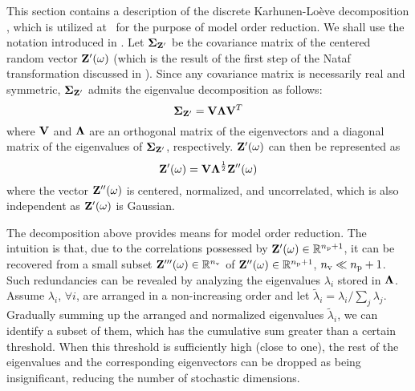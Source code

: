 This section contains a description of the discrete Karhunen-Lo\`{e}ve decomposition \cite{ghanem1991}, which is utilized at \ for the purpose of model order reduction.
We shall use the notation introduced in .
Let $\mCov_{\vZ'}$ be the covariance matrix of the centered random vector $\mathbf{Z}'(\omega)$ (which is the result of the first step of the Nataf transformation discussed in ).
  Since any covariance matrix is necessarily real and symmetric, $\mCov_{\vZ'}$ admits the eigenvalue decomposition \cite{press2007} as follows:
\[
  \mCov_{\vZ'} = \m{V} \m{\Lambda} \m{V}^T
\]
where $\m{V}$ and $\m{\Lambda}$ are an orthogonal matrix of the eigenvectors and a diagonal matrix of the eigenvalues of $\mCov_{\vZ'}$, respectively.
$\mathbf{Z}'(\omega)$ can then be represented as
\[
  \vZ'(\o) = \m{V} \m{\Lambda}^\frac{1}{2} \vZ''(\o)
\]
where the vector $\mathbf{Z}''(\omega)$ is centered, normalized, and uncorrelated, which is also independent as $\mathbf{Z}'(\omega)$ is Gaussian.

The decomposition above provides means for model order reduction.
The intuition is that, due to the correlations possessed by $\mathbf{Z}'(\omega) \in \mathbb{R}^{{n_\text{p}} + 1}$, it can be recovered from a small subset $\mathbf{Z}'''(\omega) \in \mathbb{R}^{n_\text{v}}$ of $\mathbf{Z}''(\omega) \in \mathbb{R}^{{n_\text{p}} + 1}$, ${n_\text{v}} \ll {n_\text{p}} + 1$.
Such redundancies can be revealed by analyzing the eigenvalues $\lambda_i$ stored in $\m{\Lambda}$.
Assume $\lambda_i$, $\forall i$, are arranged in a non-increasing order and let $\tilde{\lambda}_i = \lambda_i / \sum_j \lambda_j$.
Gradually summing up the arranged and normalized eigenvalues $\tilde{\lambda}_i$, we can identify a subset of them, which has the cumulative sum greater than a certain threshold.
When this threshold is sufficiently high (close to one), the rest of the eigenvalues and the corresponding eigenvectors can be dropped as being insignificant, reducing the number of stochastic dimensions.
